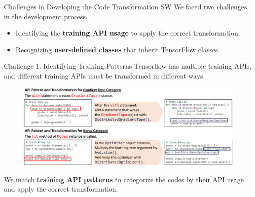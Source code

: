 \documentclass{beamer}
\begin{document}
\begin{frame}{Challenges in Developing the Code Transformation SW}
  We faced two challenges in the development process.
  \begin{itemize}
    \item Identifying the \textbf{training API usage} to apply the correct transformation. 
    \item Recognizing \textbf{user-defined classes} that inherit TensorFlow classes.
  \end{itemize} 
\end{frame}

\begin{frame}{Challenge 1. Identifying Training Patterns}
  Tensorflow has multiple training APIs, and 
  different training APIs must be transformed in different ways.

  \begin{figure}
    \includegraphics[width=\textwidth]{patternex} 
  \end{figure}
  {\footnotesize
    We match \textbf{training API patterns} to categorize the codes
    by their API usage and apply the correct transformation. 
  }
\end{frame}
\end{document}
